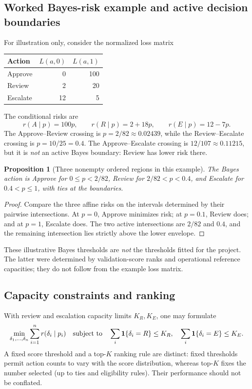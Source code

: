 \documentclass[11pt,a4paper]{article}
\newtheorem{proposition}{Proposition}[section]\newtheorem{remark}{Remark}[section]
\begin{document}
\subsection{Worked Bayes-risk example and active decision boundaries}
For illustration only, consider the normalized loss matrix
\begin{center}\begin{tabular}{lrr}\toprule Action & $L(a,0)$ & $L(a,1)$\\\midrule Approve & 0 & 100\\ Review & 2 & 20\\ Escalate & 12 & 5\\\bottomrule\end{tabular}\end{center}
The conditional risks are
\begin{equation}
r(A\mid p)=100p,\qquad r(R\mid p)=2+18p,\qquad r(E\mid p)=12-7p.
\end{equation}
The Approve--Review crossing is $p=2/82\approx0.02439$, while the Review--Escalate crossing is $p=10/25=0.4$. The Approve--Escalate crossing is $12/107\approx0.11215$, but it is \emph{not} an active Bayes boundary: Review has lower risk there.
\begin{proposition}[Three nonempty ordered regions in this example]
The Bayes action is Approve for $0\le p<2/82$, Review for $2/82<p<0.4$, and Escalate for $0.4<p\le1$, with ties at the boundaries.
\end{proposition}
\begin{proof} Compare the three affine risks on the intervals determined by their pairwise intersections. At $p=0$, Approve minimizes risk; at $p=0.1$, Review does; and at $p=1$, Escalate does. The two active intersections are $2/82$ and $0.4$, and the remaining intersection lies strictly above the lower envelope.\end{proof}
These illustrative Bayes thresholds are \emph{not} the thresholds fitted for the project. The latter were determined by validation-score ranks and operational reference capacities; they do not follow from the example loss matrix.

\subsection{Capacity constraints and ranking}
With review and escalation capacity limits $K_R,K_E$, one may formulate
\begin{equation}\min_{\delta_1,\ldots,\delta_n}\sum_{i=1}^n r(\delta_i\mid p_i)\quad\text{subject to}\quad\sum_i\mathbf 1\{\delta_i=R\}\le K_R,\quad\sum_i\mathbf 1\{\delta_i=E\}\le K_E.\end{equation}
A fixed score threshold and a top-$K$ ranking rule are distinct: fixed thresholds permit action counts to vary with the score distribution, whereas top-$K$ fixes the number selected (up to ties and eligibility rules). Their performance should not be conflated.
\end{document}
